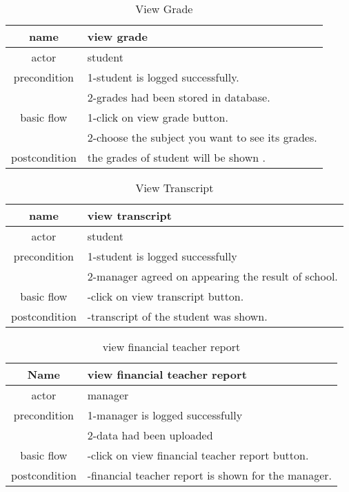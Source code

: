 \documentclass{article}
\begin{document}
    \begin{table}[!h]
    	\centering
    	\caption{View Grade}
    	\label{Viwe Grade}
    	\begin{tabular}{|c|l|}
    		\hline
    		name & view grade\\
    		\hline
    		actor & student \\
    		\hline
    		precondition & 1-student is logged successfully.\\
    		             & 2-grades had been stored in database.\\
    		\hline
    		basic flow & 1-click on view grade button.\\
    		           & 2-choose the subject you want to see its grades.\\
    		           \hline
    		postcondition & the grades of student will be shown .\\
    		\hline
    	\end{tabular}
    \end{table}
    
    \begin{table}[!h]
    	\centering
    	\label{View Transcript}
    	\caption{View Transcript}
    	\begin{tabular}{|c|l|}
    		\hline
    		name & view transcript\\
    		\hline
    		actor & student\\
    		\hline
    		precondition & 1-student is logged successfully\\
    		& 2-manager agreed on appearing the result of school.\\
    		\hline
    		basic flow & -click on view transcript button.\\
    		\hline
    		postcondition & -transcript of the student was shown.\\
    		\hline
    	\end{tabular}
    \end{table}
    
     \begin{table}
     	\centering
     	\label{view financial teacher report}
     	\caption{view financial teacher report}
     	\begin{tabular}{|c|l|}
     		\hline
     		Name & view financial teacher report\\
     		\hline
     		actor & manager\\
     		\hline
     		precondition & 1-manager is logged successfully\\
     		             & 2-data had been uploaded\\
     		\hline
     		basic flow & -click on view financial teacher report button.\\
     		\hline
     		postcondition & -financial teacher report is shown for the manager.\\
     		\hline
     	\end{tabular}
     	
     \end{table}
     
\end{document}
